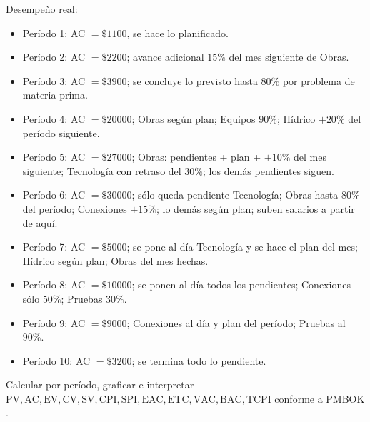 \noindent
Desempeño real:
\begin{itemize}
  \item Período 1: AC \(=\$1100\), se hace lo planificado.
  \item Período 2: AC \(=\$2200\); avance adicional \(15\%\) del mes siguiente de Obras.
  \item Período 3: AC \(=\$3900\); se concluye lo previsto hasta \(80\%\) por problema de materia prima.
  \item Período 4: AC \(=\$20000\); Obras según plan; Equipos \(90\%\); Hídrico \(+20\%\) del período siguiente.
  \item Período 5: AC \(=\$27000\); Obras: pendientes + plan + \(+10\%\) del mes siguiente; Tecnología con retraso del \(30\%\); los demás pendientes siguen.
  \item Período 6: AC \(=\$30000\); sólo queda pendiente Tecnología; Obras hasta \(80\%\) del período; Conexiones \(+15\%\); lo demás según plan; suben salarios a partir de aquí.
  \item Período 7: AC \(=\$5000\); se pone al día Tecnología y se hace el plan del mes; Hídrico según plan; Obras del mes hechas.
  \item Período 8: AC \(=\$10000\); se ponen al día todos los pendientes; Conexiones sólo \(50\%\); Pruebas \(30\%\).
  \item Período 9: AC \(=\$9000\); Conexiones al día y plan del período; Pruebas al \(90\%\).
  \item Período 10: AC \(=\$3200\); se termina todo lo pendiente.
\end{itemize}

\noindent
Calcular por período, graficar e interpretar \(\mathrm{PV, AC, EV, CV, SV, CPI, SPI, EAC, ETC, VAC, BAC, TCPI}\) conforme a PMBOK \cite{PMBOK}.

